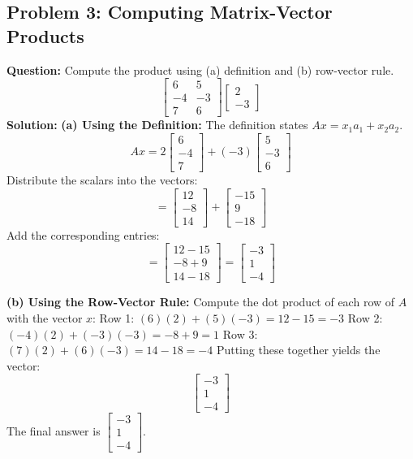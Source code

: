 \documentclass{article}
\begin{document}
\subsection{Problem 3: Computing Matrix-Vector Products}
\textbf{Question:} Compute the product using (a) definition and (b) row-vector rule.
\[ \begin{bmatrix} 6 & 5 \\ -4 & -3 \\ 7 & 6 \end{bmatrix} \begin{bmatrix} 2 \\ -3 \end{bmatrix} \]
\textbf{Solution:}
\textbf{(a) Using the Definition:}
The definition states $Ax = x_1a_1 + x_2a_2$.
\[ Ax = 2 \begin{bmatrix} 6 \\ -4 \\ 7 \end{bmatrix} + (-3) \begin{bmatrix} 5 \\ -3 \\ 6 \end{bmatrix} \]
Distribute the scalars into the vectors:
\[ = \begin{bmatrix} 12 \\ -8 \\ 14 \end{bmatrix} + \begin{bmatrix} -15 \\ 9 \\ -18 \end{bmatrix} \]
Add the corresponding entries:
\[ = \begin{bmatrix} 12 - 15 \\ -8 + 9 \\ 14 - 18 \end{bmatrix} = \begin{bmatrix} -3 \\ 1 \\ -4 \end{bmatrix} \]

\textbf{(b) Using the Row-Vector Rule:}
Compute the dot product of each row of $A$ with the vector $x$:
Row 1: $(6)(2) + (5)(-3) = 12 - 15 = -3$
Row 2: $(-4)(2) + (-3)(-3) = -8 + 9 = 1$
Row 3: $(7)(2) + (6)(-3) = 14 - 18 = -4$
Putting these together yields the vector:
\[ \begin{bmatrix} -3 \\ 1 \\ -4 \end{bmatrix} \]
The final answer is $\begin{bmatrix} -3 \\ 1 \\ -4 \end{bmatrix}$.
\end{document}
